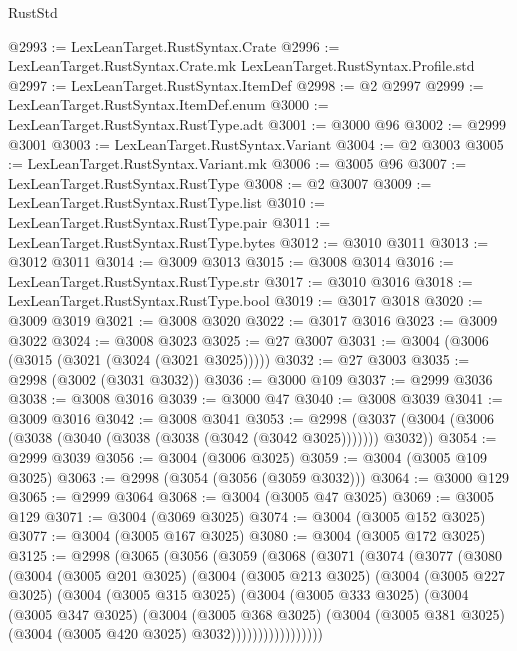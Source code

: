 \begin{lexlean}{RustStd}
\begin{coremodule}
@2993 := LexLeanTarget.RustSyntax.Crate
@2996 := LexLeanTarget.RustSyntax.Crate.mk LexLeanTarget.RustSyntax.Profile.std
@2997 := LexLeanTarget.RustSyntax.ItemDef
@2998 := @2 @2997
@2999 := LexLeanTarget.RustSyntax.ItemDef.enum
@3000 := LexLeanTarget.RustSyntax.RustType.adt
@3001 := @3000 @96
@3002 := @2999 @3001
@3003 := LexLeanTarget.RustSyntax.Variant
@3004 := @2 @3003
@3005 := LexLeanTarget.RustSyntax.Variant.mk
@3006 := @3005 @96
@3007 := LexLeanTarget.RustSyntax.RustType
@3008 := @2 @3007
@3009 := LexLeanTarget.RustSyntax.RustType.list
@3010 := LexLeanTarget.RustSyntax.RustType.pair
@3011 := LexLeanTarget.RustSyntax.RustType.bytes
@3012 := @3010 @3011
@3013 := @3012 @3011
@3014 := @3009 @3013
@3015 := @3008 @3014
@3016 := LexLeanTarget.RustSyntax.RustType.str
@3017 := @3010 @3016
@3018 := LexLeanTarget.RustSyntax.RustType.bool
@3019 := @3017 @3018
@3020 := @3009 @3019
@3021 := @3008 @3020
@3022 := @3017 @3016
@3023 := @3009 @3022
@3024 := @3008 @3023
@3025 := @27 @3007
@3031 := @3004 (@3006 (@3015 (@3021 (@3024 (@3021 @3025)))))
@3032 := @27 @3003
@3035 := @2998 (@3002 (@3031 @3032))
@3036 := @3000 @109
@3037 := @2999 @3036
@3038 := @3008 @3016
@3039 := @3000 @47
@3040 := @3008 @3039
@3041 := @3009 @3016
@3042 := @3008 @3041
@3053 := @2998 (@3037 (@3004 (@3006 (@3038 (@3040 (@3038 (@3038 (@3042 (@3042 @3025))))))) @3032))
@3054 := @2999 @3039
@3056 := @3004 (@3006 @3025)
@3059 := @3004 (@3005 @109 @3025)
@3063 := @2998 (@3054 (@3056 (@3059 @3032)))
@3064 := @3000 @129
@3065 := @2999 @3064
@3068 := @3004 (@3005 @47 @3025)
@3069 := @3005 @129
@3071 := @3004 (@3069 @3025)
@3074 := @3004 (@3005 @152 @3025)
@3077 := @3004 (@3005 @167 @3025)
@3080 := @3004 (@3005 @172 @3025)
@3125 := @2998
    (@3065
      (@3056
        (@3059
          (@3068
            (@3071
              (@3074
                (@3077
                  (@3080
                    (@3004
                      (@3005 @201 @3025)
                      (@3004
                        (@3005 @213 @3025)
                        (@3004
                          (@3005 @227 @3025)
                          (@3004
                            (@3005 @315 @3025)
                            (@3004
                              (@3005 @333 @3025)
                              (@3004
                                (@3005 @347 @3025)
                                (@3004
                                  (@3005 @368 @3025)
                                  (@3004
                                    (@3005 @381 @3025)
                                    (@3004 (@3005 @420 @3025) @3032)))))))))))))))))

\end{coremodule}
\end{lexlean}
